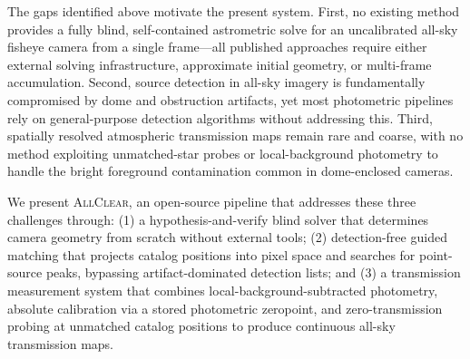 The gaps identified above motivate the present system.  First, no existing
method provides a fully blind, self-contained astrometric solve for an
uncalibrated all-sky fisheye camera from a single frame---all published
approaches require either external solving infrastructure, approximate
initial geometry, or multi-frame accumulation.  Second, source detection in
all-sky imagery is fundamentally compromised by dome and obstruction
artifacts, yet most photometric pipelines rely on general-purpose detection
algorithms without addressing this.  Third, spatially resolved atmospheric
transmission maps remain rare and coarse, with no method exploiting
unmatched-star probes or local-background photometry to handle the bright
foreground contamination common in dome-enclosed cameras.

We present \textsc{AllClear}, an open-source pipeline that addresses these
three challenges through: (1) a hypothesis-and-verify blind solver that
determines camera geometry from scratch without external tools; (2)
detection-free guided matching that projects catalog positions into pixel
space and searches for point-source peaks, bypassing artifact-dominated
detection lists; and (3) a transmission measurement system that combines
local-background-subtracted photometry, absolute calibration via a stored
photometric zeropoint, and zero-transmission probing at unmatched catalog
positions to produce continuous all-sky transmission maps.
